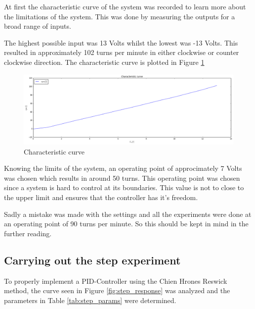 At first the characteristic curve of the system was recorded to learn more about the limitations of the system. This was done by measuring the outputs for a broad range of inputs.

The highest possible input was 13 Volts whilst the lowest was -13 Volts. This resulted in approximately 102 turns per minute in either clockwise or counter clockwise direction.
The characteristic curve is plotted in Figure \ref{fig:characteristic_curve}

\begin{figure}[H]
\begin{center}
\includegraphics[width=1\linewidth]{images/general/characteristic_curve}
\end{center}
\caption{Characteristic curve}
\label{fig:characteristic_curve}
\end{figure}

Knowing the limits of the system, an operating point of approcimately 7 Volts was chosen which results in around 50 turns. This operating point was chosen since a system is hard to control at its boundaries. This value is not to close to the upper limit and ensures that the controller has it's freedom.

Sadly a mistake was made  with the settings and all the experiments were done at an operating point of 90 turns per minute. So this should be kept in mind in the further reading.

\subsection{Carrying out the step experiment}

To properly implement a PID-Controller using the Chien Hrones Reswick method, the curve seen in Figure \ref{fig:step_response} was analyzed and the parameters in Table \ref{tab:step_params} were determined.

